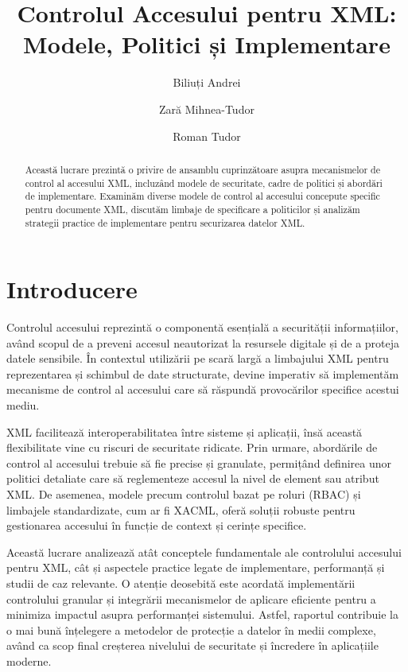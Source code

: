 \documentclass[runningheads]{llncs}
\begin{document}
\title{Controlul Accesului pentru XML: Modele, Politici și Implementare}
\author{Biliuți Andrei \and Zară Mihnea-Tudor \and Roman Tudor}
\maketitle
\begin{abstract}
Această lucrare prezintă o privire de ansamblu cuprinzătoare asupra mecanismelor de control al accesului XML, incluzând modele de securitate, cadre de politici și abordări de implementare. Examinăm diverse modele de control al accesului concepute specific pentru documente XML, discutăm limbaje de specificare a politicilor și analizăm strategii practice de implementare pentru securizarea datelor XML.
\end{abstract}




\section{Introducere}

Controlul accesului reprezintă o componentă esențială a securității informațiilor, având scopul de a preveni accesul neautorizat la resursele digitale și de a proteja datele sensibile. În contextul utilizării pe scară largă a limbajului XML pentru reprezentarea și schimbul de date structurate, devine imperativ să implementăm mecanisme de control al accesului care să răspundă provocărilor specifice acestui mediu.

XML facilitează interoperabilitatea între sisteme și aplicații, însă această flexibilitate vine cu riscuri de securitate ridicate. Prin urmare, abordările de control al accesului trebuie să fie precise și granulate, permițând definirea unor politici detaliate care să reglementeze accesul la nivel de element sau atribut XML. De asemenea, modele precum controlul bazat pe roluri (RBAC) și limbajele standardizate, cum ar fi XACML, oferă soluții robuste pentru gestionarea accesului în funcție de context și cerințe specifice.

Această lucrare analizează atât conceptele fundamentale ale controlului accesului pentru XML, cât și aspectele practice legate de implementare, performanță și studii de caz relevante. O atenție deosebită este acordată implementării controlului granular și integrării mecanismelor de aplicare eficiente pentru a minimiza impactul asupra performanței sistemului. Astfel, raportul contribuie la o mai bună înțelegere a metodelor de protecție a datelor în medii complexe, având ca scop final creșterea nivelului de securitate și încredere în aplicațiile moderne.
\end{document}
